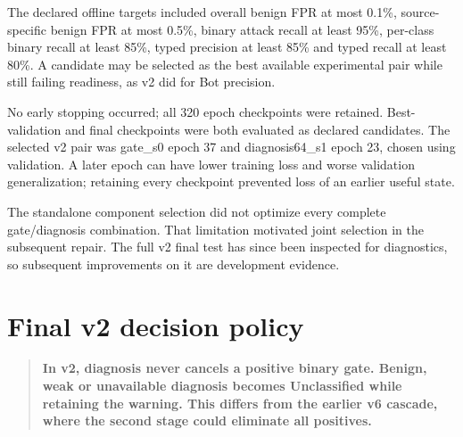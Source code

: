 \documentclass[11pt,a4paper,oneside]{report}
\newcommand{\important}[1]{\begin{quote}\color{blue!45!black}\textbf{#1}\end{quote}}
\begin{document}
The declared offline targets included overall benign FPR at most 0.1\%, source-specific benign FPR at most 0.5\%, binary attack recall at least 95\%, per-class binary recall at least 85\%, typed precision at least 85\% and typed recall at least 80\%. A candidate may be selected as the best available experimental pair while still failing readiness, as v2 did for Bot precision.

No early stopping occurred; all 320 epoch checkpoints were retained. Best-validation and final checkpoints were both evaluated as declared candidates. The selected v2 pair was gate\_s0 epoch 37 and diagnosis64\_s1 epoch 23, chosen using validation. A later epoch can have lower training loss and worse validation generalization; retaining every checkpoint prevented loss of an earlier useful state.

The standalone component selection did not optimize every complete gate/diagnosis combination. That limitation motivated joint selection in the subsequent repair. The full v2 final test has since been inspected for diagnostics, so subsequent improvements on it are development evidence.

\section{Final v2 decision policy}
\begin{center}
\end{center}
\important{In v2, diagnosis never cancels a positive binary gate. Benign, weak or unavailable diagnosis becomes Unclassified while retaining the warning. This differs from the earlier v6 cascade, where the second stage could eliminate all positives.}
\end{document}
